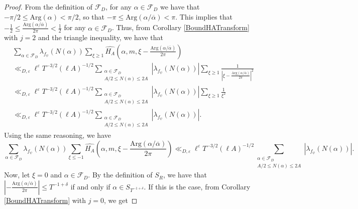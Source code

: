 \documentclass[11pt]{amsart}
\theoremstyle{definition}
\theoremstyle{remark}
\begin{document}
\begin{proof}
From the definition of $\mathcal{F}_{D}$, for any $\alpha \in \mathcal{F}_{D}$ we have that $-\pi/2 \leq \mathrm{Arg}(\alpha) < \pi/2$, so that $-\pi \leq \mathrm{Arg}(\alpha/\overline{\alpha}) < \pi$. This implies that $-\frac{1}{2} \leq \frac{\mathrm{Arg}(\alpha / \overline{\alpha})}{2\pi} < \frac{1}{2}$ for any $\alpha \in \mathcal{F}_{D}$. Thus, from Corollary \ref{BoundHATransform} with $j=2$ and the triangle inequality, we have that
\begin{align}
    &\sum_{\alpha \in \mathcal{F}_{D}} \lambda_{f_{\psi}}(N(\alpha)) \sum_{\xi\geq 1} \widehat{H_A}\left( \alpha,m,\xi-\frac{\mathrm{Arg}(\alpha/\overline{\alpha})}{2 \pi} \right) \label{BoundInnerSumsSa-1} \\
    &\ll_{D,\varepsilon} \ell^{\varepsilon} T^{-3/2} (\ell A)^{-1/2} \sum_{\substack{\alpha \in \mathcal{F}_{D} \\ A/2 \leq N(\alpha) \leq 2A}} |\lambda_{f_{\psi}}(N(\alpha))| \sum_{\xi\geq 1} \frac{1}{\left| \xi - \frac{\mathrm{Arg}(\alpha/\overline{\alpha})}{2 \pi} \right|^2} \nonumber \\
    &\ll_{D,\varepsilon} \ell^{\varepsilon} T^{-3/2} (\ell A)^{-1/2} \sum_{\substack{\alpha \in \mathcal{F}_{D} \\ A/2 \leq N(\alpha) \leq 2A}} |\lambda_{f_{\psi}}(N(\alpha))| \sum_{\xi\geq 1} \frac{1}{\xi^2} \nonumber \\
    &\ll_{D,\varepsilon} \ell^{\varepsilon} T^{-3/2} (\ell A)^{-1/2} \sum_{\substack{\alpha \in \mathcal{F}_{D} \\ A/2 \leq N(\alpha) \leq 2A}} |\lambda_{f_{\psi}}(N(\alpha))|. \nonumber
\end{align}
Using the same reasoning, we have
\begin{equation}
    \sum_{\alpha \in \mathcal{F}_{D}} \lambda_{f_{\psi}}(N(\alpha)) \sum_{\xi\leq -1} \widehat{H_A}\left( \alpha,m,\xi-\frac{\mathrm{Arg}(\alpha/\overline{\alpha})}{2 \pi} \right) \ll_{D,\varepsilon} \ell^{\varepsilon} T^{-3/2} (\ell A)^{-1/2} \sum_{\substack{\alpha \in \mathcal{F}_{D} \\ A/2 \leq N(\alpha) \leq 2A}} |\lambda_{f_{\psi}}(N(\alpha))|. \label{BoundInnerSumsSa-2}
\end{equation}
Now, let $\xi = 0$ and $\alpha \in \mathcal{F}_{D}$. By the definition of $S_{R}$, we have that $\left|-\frac{\mathrm{Arg}(\alpha/\overline{\alpha})}{2 \pi} \right| \leq T^{-1+\delta}$ if and only if $\alpha \in S_{T^{-1+\delta}}$. If this is the case, from Corollary \ref{BoundHATransform} with $j=0$, we get 

\end{proof}
\end{document}
